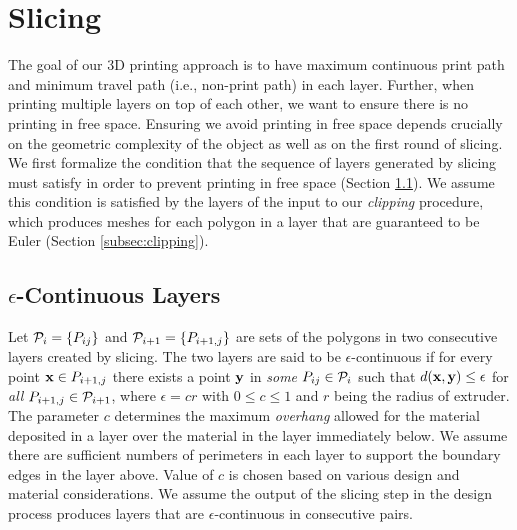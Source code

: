 
\section{Slicing}\label{sec:slicing}
The goal of our 3D printing approach is to have maximum continuous print path and minimum travel path (i.e., non-print path) in each layer.
Further, when printing multiple layers on top of each other, we want to ensure there is no printing in free space.
Ensuring we avoid printing in free space depends crucially on the geometric complexity of the object as well as on the first round of slicing.
We first formalize the condition that the sequence of layers generated by slicing must satisfy in order to prevent printing in free space (Section \ref{subsec:contilayers}).
We assume this condition is satisfied by the layers of the input to our \emph{clipping} procedure, which produces meshes for each polygon in a layer that are guaranteed to be Euler (Section \ref{subsec:clipping}).
 
%
\subsection{$\epsilon$-Continuous Layers}\label{subsec:contilayers}
Let $\mathcal{P}_i = \{P_{ij}\}$ and $\mathcal{P}_{i+1} = \{P_{i+1,j}\}$ are sets of the polygons in two consecutive layers created by slicing.
The two layers are said to be $\epsilon$-continuous if for every point $\mathbf{x} \in P_{i+1,j}$ there exists a point $\mathbf{y}$ in \emph{some} $P_{ij} \in \mathcal{P}_i$ such that $ d(\mathbf{x}, \mathbf{y}) \leq \epsilon$ for \emph{all} $P_{i+1,j} \in \mathcal{P}_{i+1}$, where  $\epsilon = c r$ with $0 \leq c \leq 1$ and $r$ being the radius of extruder. %
The parameter $c$ determines the maximum \emph{overhang} allowed for the material deposited in a layer over the material in the layer immediately below.
We assume there are sufficient numbers of perimeters in each layer to support the boundary edges in the layer above.
Value of $c$ is chosen based on various design and material considerations.
We assume the output of the slicing step in the design process produces layers that are $\epsilon$-continuous in consecutive pairs.

